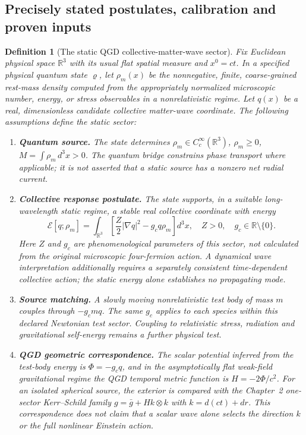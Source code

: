 \documentclass[11pt,a4paper]{article}
\newtheorem{definition}[theorem]{Definition}
\theoremstyle{remark}\newtheorem{remark}[theorem]{Remark}
\begin{document}
\subsection{Precisely stated postulates, calibration and proven inputs}
\begin{definition}[The static QGD collective-matter-wave sector]\label{def:v30-sector}
Fix Euclidean physical space $\mathbb R^3$ with its usual flat spatial measure and $x^0=ct$. In a specified physical quantum state $\varrho$, let $\rho_m(x)$ be the nonnegative, finite, coarse-grained rest-mass density computed from the appropriately normalized microscopic number, energy, or stress observables in a nonrelativistic regime. Let $q(x)$ be a real, \emph{dimensionless} candidate collective matter-wave coordinate. The following assumptions define the static sector:
\begin{enumerate}[label=\textbf{MW\arabic*.},leftmargin=1.8em]
\item\label{hyp:v30-state} \textbf{Quantum source.} The state determines $\rho_m\in C_c^\infty(\mathbb R^3)$, $\rho_m\ge0$, $M=\int\rho_m\,d^3x>0$. The quantum bridge constrains phase transport where applicable; it is not asserted that a static source has a nonzero net radial current.
\item\label{hyp:v30-energy} \textbf{Collective response postulate.} The state supports, in a suitable long-wavelength static regime, a stable real collective coordinate with energy
\begin{equation}\label{eq:v30-Eq}
\boxed{\mathcal E[q;\rho_m]=\int_{\mathbb R^3}\left[\frac Z2|\nabla q|^2-g_cq\rho_m\right]d^3x,\quad Z>0,\quad g_c\in\mathbb R\setminus\{0\}.}
\end{equation}
Here $Z$ and $g_c$ are \emph{phenomenological parameters of this sector}, not calculated from the original microscopic four-fermion action. A dynamical wave interpretation additionally requires a separately consistent time-dependent collective action; the static energy alone establishes no propagating mode.
\item\label{hyp:v30-probes} \textbf{Source matching.} A slowly moving nonrelativistic test body of mass $m$ couples through $-g_cmq$. The same $g_c$ applies to each species \emph{within this declared Newtonian test sector}. Coupling to relativistic stress, radiation and gravitational self-energy remains a further physical test.
\item\label{hyp:v30-map} \textbf{QGD geometric correspondence.} The scalar potential inferred from the test-body energy is $\Phi=-g_cq$, and in the asymptotically flat weak-field gravitational regime the QGD temporal metric function is $H=-2\Phi/c^2$. For an isolated spherical source, the \emph{exterior} is compared with the Chapter~2 one-sector Kerr--Schild family $g=\bar g+Hk\otimes k$ with $k=d(ct)+dr$. This correspondence does not claim that a scalar wave alone selects the direction $k$ or the full nonlinear Einstein action.
\end{enumerate}
\end{definition}
\end{document}
